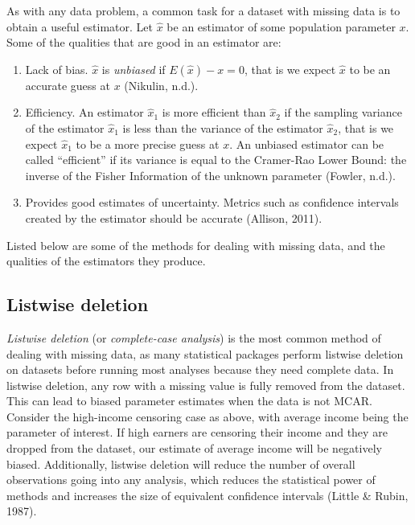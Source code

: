 \documentclass[12pt,twoside]{reedthesis}
\begin{document}
As with any data problem, a common task for a dataset with missing data is to obtain a useful estimator. Let \(\hat{x}\) be an estimator of some population parameter \(x\). Some of the qualities that are good in an estimator are:
\begin{enumerate}
\def\labelenumi{\arabic{enumi}.}
\item
  Lack of bias. \(\hat{x}\) is \emph{unbiased} if \(E(\hat{x}) - x = 0\), that is we expect \(\hat{x}\) to be an accurate guess at \(x\) (Nikulin, n.d.).
\item
  Efficiency. An estimator \(\hat{x}_1\) is more efficient than \(\hat{x}_2\) if the sampling variance of the estimator \(\hat{x}_1\) is less than the variance of the estimator \(\hat{x}_2\), that is we expect \(\hat{x}_1\) to be a more precise guess at \(x\). An unbiased estimator can be called ``efficient'' if its variance is equal to the Cramer-Rao Lower Bound: the inverse of the Fisher Information of the unknown parameter (Fowler, n.d.).
\item
  Provides good estimates of uncertainty. Metrics such as confidence intervals created by the estimator should be accurate (Allison, 2011).
\end{enumerate}
Listed below are some of the methods for dealing with missing data, and the qualities of the estimators they produce.

\hypertarget{listwise-deletion}{%
\subsection{Listwise deletion}\label{listwise-deletion}}

\emph{Listwise deletion} (or \emph{complete-case analysis}) is the most common method of dealing with missing data, as many statistical packages perform listwise deletion on datasets before running most analyses because they need complete data. In listwise deletion, any row with a missing value is fully removed from the dataset. This can lead to biased parameter estimates when the data is not MCAR. Consider the high-income censoring case as above, with average income being the parameter of interest. If high earners are censoring their income and they are dropped from the dataset, our estimate of average income will be negatively biased. Additionally, listwise deletion will reduce the number of overall observations going into any analysis, which reduces the statistical power of methods and increases the size of equivalent confidence intervals (Little \& Rubin, 1987).
\end{document}
